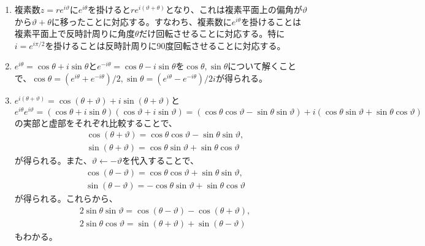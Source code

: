 \begin{kaitou*}
\begin{enumerate}
\item 複素数$z=re^{i\vartheta}$に$e^{i\theta}$を掛けると$re^{i(\vartheta+\theta)}$となり、これは複素平面上の偏角が$\vartheta$から$\vartheta+\theta$に移ったことに対応する。すなわち、複素数に$e^{i\theta}$を掛けることは複素平面上で反時計周りに角度$\theta$だけ回転させることに対応する。特に$i=e^{i\pi/2}$を掛けることは反時計周りに90度回転させることに対応する。

\item $e^{i\theta}=\cos\theta+i\sin\theta$と$e^{-i\theta}=\cos\theta-i\sin\theta$を$\cos\theta,\sin\theta$について解くことで、$\cos\theta=(e^{i\theta}+e^{-i\theta})/2,\sin\theta=(e^{i\theta}-e^{-i\theta})/2i$が得られる。

\item $e^{i(\theta+\vartheta)}=\cos(\theta+\vartheta)+i\sin(\theta+\vartheta)$と$e^{i\theta}e^{i\vartheta}=(\cos\theta+i\sin\theta)(\cos\vartheta+i\sin\vartheta)=(\cos\theta\cos\vartheta-\sin\theta\sin\vartheta)+i(\cos\theta\sin\vartheta+\sin\theta\cos\vartheta)$の実部と虚部をそれぞれ比較することで、
\begin{align*}
&\cos(\theta+\vartheta)=\cos\theta\cos\vartheta-\sin\theta\sin\vartheta, \\
&\sin(\theta+\vartheta)=\cos\theta\sin\vartheta+\sin\theta\cos\vartheta  
\end{align*}
が得られる。また、$\vartheta\leftarrow -\vartheta$を代入することで、
\begin{align*}
&\cos(\theta-\vartheta)=\cos\theta\cos\vartheta+\sin\theta\sin\vartheta, \\
&\sin(\theta-\vartheta)=-\cos\theta\sin\vartheta+\sin\theta\cos\vartheta  
\end{align*}
が得られる。これらから、
\begin{align*}
&2\sin\theta\sin\vartheta=\cos(\theta-\vartheta)-\cos(\theta+\vartheta), \\
&2\sin\theta\cos\vartheta=\sin(\theta+\vartheta)+\sin(\theta-\vartheta)
\end{align*}
もわかる。
\end{enumerate}
\end{kaitou*}
